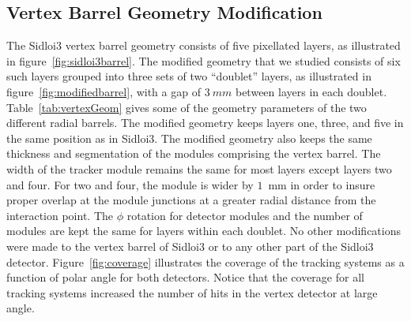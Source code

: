 \subsection{Vertex Barrel Geometry Modification}
The Sidloi3 vertex barrel geometry consists of five pixellated layers, as illustrated in figure~\ref{fig:sidloi3barrel}.
The modified geometry that we studied consists of six such layers grouped into three sets of two ``doublet'' layers, 
as illustrated in figure~\ref{fig:modifiedbarrel}, with a gap of $3~mm$ between layers in each doublet.
Table~\ref{tab:vertexGeom} gives some of the geometry parameters of the two different radial barrels.
The modified geometry keeps layers one, three, and five in the same position as in Sidloi3.
The modified geometry also keeps the same thickness and segmentation
of the modules comprising the vertex barrel.
The width of the tracker module remains the same for most layers except layers two and four.
For two and four, the module is wider by $1$~mm in order to 
insure proper overlap at the module junctions at a greater radial distance from the interaction point.
The $\phi$ rotation for detector modules and the number of modules
are kept the same for layers within each doublet.
No other modifications were made to the vertex barrel of Sidloi3 or to any other part of the Sidloi3 detector.
Figure~\ref{fig:coverage} illustrates the coverage of the tracking systems as a function of polar angle for both detectors.
Notice that the coverage for all tracking systems increased the number of hits
in the vertex detector at large angle.
